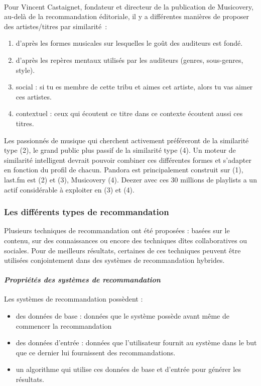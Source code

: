 \paragraph{}
Pour Vincent Castaignet, fondateur et directeur de la publication de Musicovery, au-delà de la recommandation éditoriale, il y a différentes manières de proposer des artistes/titres par similarité~:
\begin{enumerate}
	\item d’après les formes musicales sur lesquelles le goût des auditeurs est fondé.
	\item d’après les repères mentaux utilisés par les auditeurs (genres, sous-genres, style).
	\item social  : si tu es membre de cette tribu et aimes cet artiste, alors tu vas aimer ces artistes.
	\item contextuel  : ceux qui écoutent ce titre dans ce contexte écoutent aussi ces titres.
\end{enumerate}
Les passionnés de musique qui cherchent activement préféreront de la similarité type (2), le grand public plus passif de la similarité type (4). Un moteur de similarité intelligent devrait pouvoir combiner ces différentes formes et s’adapter en fonction du profil de chacun.
Pandora est principalement construit sur (1), last.fm est (2) et (3), Musicovery (4). Deezer avec ces 30 millions de playlists a un actif considérable à exploiter en (3) et (4).

 		\subsubsection*{Les différents types de recommandation}
Plusieurs techniques de recommandation ont été proposées : basées sur le contenu, sur des connaissances ou encore des techniques dîtes collaboratives ou sociales. Pour de meilleurs résultats, certaines de ces techniques peuvent être utilisées conjointement dans des systèmes de recommandation hybrides.

	\paragraph{\emph{Propriétés des systèmes de recommandation} \\ \quad}
Les systèmes de recommandation possèdent :
\begin{itemize}
	\item des données de base : données que le système possède avant même de commencer la recommandation
	\item des données d’entrée : données que l’utilisateur fournit au système dans le but que ce dernier lui fournissent des recommandations.
	\item un algorithme qui utilise ces données de base et d’entrée pour générer les résultats.
\end{itemize}

